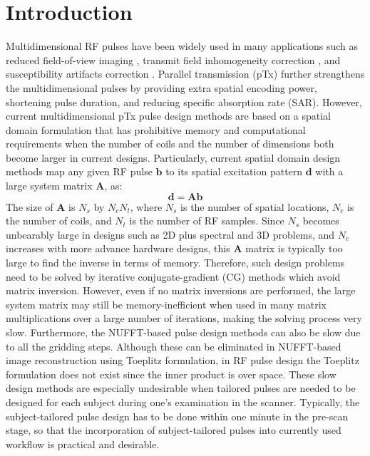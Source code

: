 \section* {Introduction}

\par Multidimensional RF pulses have been widely used in many applications such as reduced field-of-view imaging \cite{rieseberg2002two}, transmit field inhomogeneity correction \cite{saekho2005small}, and susceptibility artifacts correction \cite{stenger2000three}. Parallel transmission (pTx) \cite{katscher2003transmit,zhu2004parallel} further strengthens the multidimensional pulses by providing extra spatial encoding power, shortening pulse duration, and reducing  specific absorption rate (SAR). However, current multidimensional pTx pulse design methods are based on a spatial domain formulation \cite{Grissom:2006:MRM,setsompop2008magnitude} that has prohibitive memory and computational requirements when the number of coils and the number of dimensions both become larger in current designs. 
Particularly, current spatial domain design methods map any given RF pulse $\mathbf{b}$ to its spatial excitation pattern $\mathbf{d}$ with a large system matrix $\mathbf{A}$, as:
\begin{equation*}
	\mathbf{d}=\mathbf{Ab}
\end{equation*}
The size of $\mathbf{A}$ is $N_s$ by $N_cN_t$, where $N_s$ is the number of spatial locations, $N_c$ is the number of coils, and $N_t$ is the number of RF samples. Since $N_s$ becomes unbearably large in designs such as 2D plus spectral and 3D problems, and $N_c$ increases with more advance hardware designs, this $\mathbf{A}$ matrix is typically too large to find the inverse in terms of memory. Therefore, such design problems need to be solved by iterative conjugate-gradient (CG) methods which avoid matrix inversion. However, even if no matrix inversions are performed, the large system matrix may still be memory-inefficient when used in many matrix multiplications over a large number of iterations, making the solving process very slow. Furthermore, the NUFFT-based pulse design methods can also be slow due to all the gridding steps. Although these can be eliminated in NUFFT-based image reconstruction using Toeplitz formulation, in RF pulse design the Toeplitz formulation does not exist since the inner product is over space. 
These slow design methods are especially undesirable when tailored pulses are needed to be designed for each subject during one's examination in the scanner. Typically, the subject-tailored pulse design has to be done within one minute in the pre-scan stage, so that the incorporation of subject-tailored pulses into currently used workflow is practical and desirable.  

